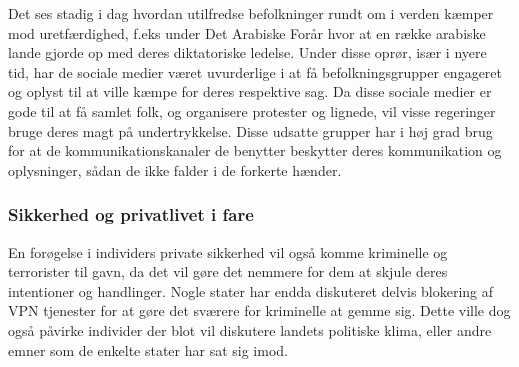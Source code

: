Det ses stadig i dag hvordan utilfredse befolkninger rundt om i verden kæmper mod uretfærdighed, f.eks under Det Arabiske Forår hvor at en række arabiske lande gjorde op med deres diktatoriske ledelse.\cite{ArabiskeForaar} Under disse oprør, især i nyere tid, har de sociale medier været uvurderlige i at få befolkningsgrupper engageret og oplyst til at ville kæmpe for deres respektive sag. Da disse sociale medier er gode til at få samlet folk, og organisere protester og lignede, vil visse regeringer bruge deres magt på undertrykkelse. 
Disse udsatte grupper har i høj grad brug for at de kommunikationskanaler de benytter beskytter deres kommunikation og oplysninger, sådan de ikke falder i de forkerte hænder.

\subsubsection{Sikkerhed og privatlivet i fare}
En forøgelse i individers private sikkerhed vil også komme kriminelle og terrorister til gavn, da det vil gøre det nemmere for dem at skjule deres intentioner og handlinger.
Nogle stater har endda diskuteret delvis blokering af VPN tjenester for at gøre det sværere for kriminelle at gemme sig. Dette ville dog også påvirke individer der blot vil diskutere landets politiske klima, eller andre emner som de enkelte stater har sat sig imod.

